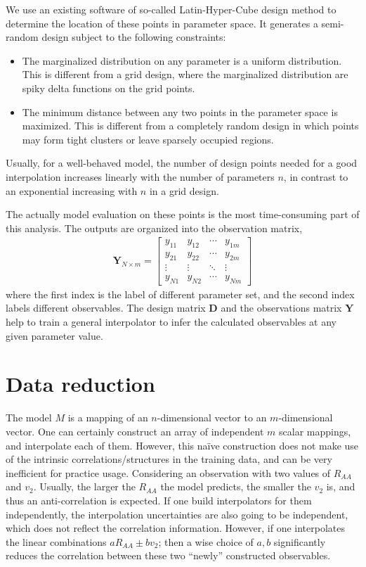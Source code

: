 We use an existing software \cite{lhs-r} of so-called Latin-Hyper-Cube design method \cite{MORRIS1995381} to determine the location of these points in parameter space.
It generates a semi-random design subject to the following constraints:
\begin{itemize}
\item The marginalized distribution on any parameter is a uniform distribution.
This is different from a grid design, where the marginalized distribution are spiky delta functions on the grid points.
\item The minimum distance between any two points in the parameter space is maximized.
This is different from a completely random design in which points may form tight clusters or leave sparsely occupied regions.
\end{itemize}
Usually, for a well-behaved model, the number of design points needed for a good interpolation increases linearly with the number of parameters $n$, in contrast to an exponential increasing with $n$ in a grid design.

The actually model evaluation on these points is the most time-consuming part of this analysis.
The outputs are organized into the observation matrix,
\begin{eqnarray}
\mathbf{Y}_{N\times m} = 
\begin{bmatrix}
y_{11} & y_{12} & \cdots & y_{1m}\\
y_{21} & y_{22} & \cdots & y_{2m}\\
\vdots & \vdots & \ddots & \vdots \\
y_{N1} & y_{N2} & \cdots & y_{Nm}
\end{bmatrix}
\end{eqnarray}
where the first index is the label of different parameter set, and the second index labels different observables.
The design matrix $\mathbf{D}$ and the observations matrix $\mathbf{Y}$ help to train a general interpolator to infer the calculated observables at any given parameter value.

\section{Data reduction}
The model $M$ is a mapping of an $n$-dimensional vector to an $m$-dimensional vector. 
One can certainly construct an array of independent $m$ scalar mappings, and interpolate each of them.
However, this na\"ive construction does not make use of the intrinsic correlations/structures in the training data, and can be very inefficient for practice usage.
Considering an observation with two values of $R_{AA}$ and $v_2$. Usually, the larger the $R_{AA}$ the model predicts, the smaller the $v_2$ is, and thus an anti-correlation is expected.
If one build interpolators for them independently, the interpolation uncertainties are also going to be independent, which does not reflect the correlation information.
However, if one interpolates the linear combinations $a R_{AA} \pm b v_2$; then a wise choice of $a, b$ significantly reduces the correlation between these two ``newly'' constructed observables.

